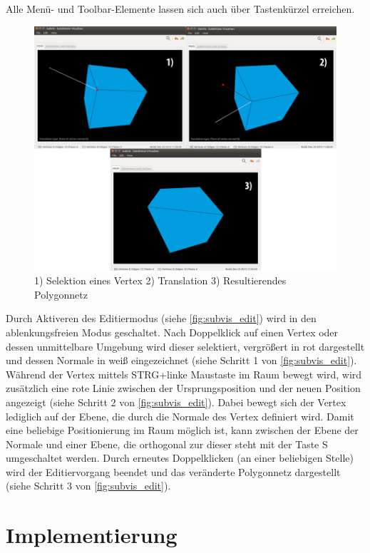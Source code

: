 Alle Menü- und Toolbar-Elemente lassen sich auch über Tastenkürzel erreichen.

\begin{figure}
  \centering
  \includegraphics[width=\textwidth]{content/media/subvis_edit.png}
  \caption{1) Selektion eines Vertex 2) Translation 3) Resultierendes Polygonnetz}
  \label{fig:subvis_edit}
\end{figure}

Durch Aktiveren des Editiermodus (siehe \autoref{fig:subvis_edit}) wird in den ablenkungsfreien Modus geschaltet.
Nach Doppelklick auf einen Vertex oder dessen unmittelbare Umgebung wird dieser selektiert, vergrößert in rot dargestellt und dessen Normale in weiß eingezeichnet (siehe Schritt 1 von \autoref{fig:subvis_edit}).
Während der Vertex mittels STRG+linke Maustaste im Raum bewegt wird, wird zusätzlich eine rote Linie zwischen der Ursprungsposition und der neuen Position angezeigt (siehe Schritt 2 von \autoref{fig:subvis_edit}).
Dabei bewegt sich der Vertex lediglich auf der Ebene, die durch die Normale des Vertex definiert wird.
Damit eine beliebige Positionierung im Raum möglich ist, kann zwischen der Ebene der Normale und einer Ebene, die orthogonal zur dieser steht mit der Taste S umgeschaltet werden.
Durch erneutes Doppelklicken (an einer beliebigen Stelle) wird der Editiervorgang beendet und das veränderte Polygonnetz dargestellt (siehe Schritt 3 von \autoref{fig:subvis_edit}).


\section{Implementierung}

